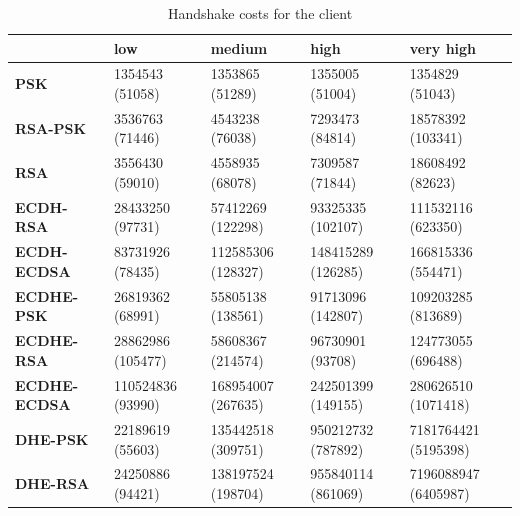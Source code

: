 \documentclass{llncs}
\begin{document}
\begin{table}[]
  \begin{tabular}{|l|l|l|l|l|}
  \hline
                       & \textbf{low}      & \textbf{medium}    & \textbf{high}      & \textbf{very high}   \\ \hline
  \textbf{PSK}         & 1354543 (51058)   & 1353865 (51289)    & 1355005 (51004)    & 1354829 (51043)      \\ \hline
  \textbf{RSA-PSK}     & 3536763 (71446)   & 4543238 (76038)    & 7293473 (84814)    & 18578392 (103341)    \\ \hline
  \textbf{RSA}         & 3556430 (59010)   & 4558935 (68078)    & 7309587 (71844)    & 18608492 (82623)     \\ \hline
  \textbf{ECDH-RSA}    & 28433250 (97731)  & 57412269 (122298)  & 93325335 (102107)  & 111532116 (623350)   \\ \hline
  \textbf{ECDH-ECDSA}  & 83731926 (78435)  & 112585306 (128327) & 148415289 (126285) & 166815336 (554471)   \\ \hline
  \textbf{ECDHE-PSK}   & 26819362 (68991)  & 55805138 (138561)  & 91713096 (142807)  & 109203285 (813689)   \\ \hline
  \textbf{ECDHE-RSA}   & 28862986 (105477) & 58608367 (214574)  & 96730901 (93708)   & 124773055 (696488)   \\ \hline
  \textbf{ECDHE-ECDSA} & 110524836 (93990) & 168954007 (267635) & 242501399 (149155) & 280626510 (1071418)  \\ \hline
  \textbf{DHE-PSK}     & 22189619 (55603)  & 135442518 (309751) & 950212732 (787892) & 7181764421 (5195398) \\ \hline
  \textbf{DHE-RSA}     & 24250886 (94421)  & 138197524 (198704) & 955840114 (861069) & 7196088947 (6405987) \\ \hline
  \end{tabular}
  \caption{\label{table:client-hs-cost-all-sls} Handshake costs for the client}
  \end{table}
\end{document}
